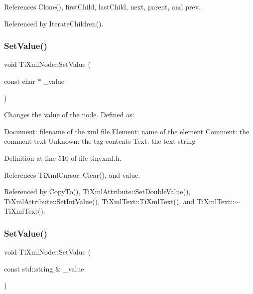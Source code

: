 References Clone(), first\+Child, last\+Child, next, parent, and prev.



Referenced by Iterate\+Children().

\hypertarget{class_ti_xml_node_a2a38329ca5d3f28f98ce932b8299ae90}{}\label{class_ti_xml_node_a2a38329ca5d3f28f98ce932b8299ae90} 
\subsubsection{\texorpdfstring{Set\+Value()}{SetValue()}\hspace{0.1cm}{\footnotesize\ttfamily [1/2]}}
{\footnotesize\ttfamily void Ti\+Xml\+Node\+::\+Set\+Value (\begin{DoxyParamCaption}\item[{const char $\ast$}]{\+\_\+value }\end{DoxyParamCaption})\hspace{0.3cm}{\ttfamily [inline]}}

Changes the value of the node. Defined as\+: \begin{DoxyVerb}Document: filename of the xml file
Element:  name of the element
Comment:  the comment text
Unknown:  the tag contents
Text:             the text string
\end{DoxyVerb}
 

Definition at line 510 of file tinyxml.\+h.



References Ti\+Xml\+Cursor\+::\+Clear(), and value.



Referenced by Copy\+To(), Ti\+Xml\+Attribute\+::\+Set\+Double\+Value(), Ti\+Xml\+Attribute\+::\+Set\+Int\+Value(), Ti\+Xml\+Text\+::\+Ti\+Xml\+Text(), and Ti\+Xml\+Text\+::$\sim$\+Ti\+Xml\+Text().

\hypertarget{class_ti_xml_node_a2598d5f448042c1abbeae4503dd45ff2}{}\label{class_ti_xml_node_a2598d5f448042c1abbeae4503dd45ff2} 
\subsubsection{\texorpdfstring{Set\+Value()}{SetValue()}\hspace{0.1cm}{\footnotesize\ttfamily [2/2]}}
{\footnotesize\ttfamily void Ti\+Xml\+Node\+::\+Set\+Value (\begin{DoxyParamCaption}\item[{const std\+::string \&}]{\+\_\+value }\end{DoxyParamCaption})\hspace{0.3cm}{\ttfamily [inline]}}



